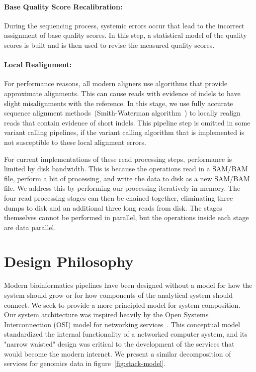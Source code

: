 \documentclass[10pt,twocolumn]{article}
\theoremstyle{plain}
\begin{document}
\paragraph{Base Quality Score Recalibration:} 
\label{sec:bqsr}

During the sequencing process, systemic errors occur that lead to the incorrect assignment of base quality scores. In this step, a
statistical model of the quality scores is built and is then used to revise the measured quality scores.

\paragraph{Local Realignment:} 
\label{sec:local-realignment}

For performance reasons, all modern aligners use algorithms that provide approximate alignments. This can cause reads with
evidence of indels to have slight misalignments with the reference. In this stage, we use fully accurate sequence alignment
methods~(Smith-Waterman algorithm~\cite{smith81}) to locally realign reads that contain evidence of short indels. This pipeline
step is omitted in some variant calling pipelines, if the variant calling algorithm that is implemented is not susceptible to these
local alignment errors.

For current implementations of these read processing steps, performance is limited by disk bandwidth. This is because the operations
read in a SAM/BAM file, perform a bit of processing, and write the data to disk as a new SAM/BAM file. We address this by performing
our processing iteratively in memory. The four read processing stages can then be chained together, eliminating three dumps to
disk and an additional three long reads from disk. The stages themselves cannot be performed in parallel, but the operations inside each
stage are data parallel. 

\section{Design Philosophy}
\label{sec:design-philosophy}

Modern bioinformatics pipelines have been designed without a model for how the system should grow or for how
components of the analytical system should connect. We seek to provide a more principled model for system composition.
Our system architecture was inspired heavily by the Open Systems Interconnection (OSI) model for networking
services~\cite{zimmermann80}. This conceptual model standardized the internal functionality of a networked
computer system, and its "narrow waisted" design was critical to the development of the services that would
become the modern internet. We present a similar decomposition of services for genomics data in
figure~\ref{fig:stack-model}.
\end{document}
